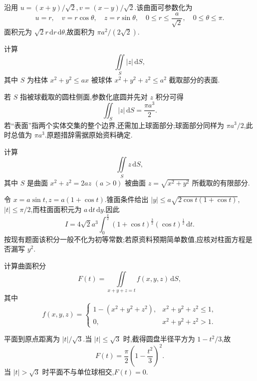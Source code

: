 \begin{solution}
    沿用 $u=(x+y)/\sqrt{2},v=(x-y)/\sqrt{2}$.该曲面可参数化为
    \[
        u=r,\quad v=r\cos\theta,\quad z=r\sin\theta,\quad
        0\leq r\leq\dfrac{a}{\sqrt{2}},\quad0\leq\theta\leq\pi.
    \]
    面积元为 $\sqrt{2}r\,\mathrm{d}r\,\mathrm{d}\theta$,故面积为 $\pi a^2/(2\sqrt{2})$.
\end{solution}

\begin{example}
    计算
    \[
        \iint\limits_S|z|\,\mathrm{d}S,
    \]
    其中 $S$ 为柱体 $x^2+y^2\leq ax$ 被球体 $x^2+y^2+z^2\leq a^2$ 截取部分的表面.
\end{example}
\exampleblank

\begin{solution}
    若 $S$ 指被球截取的圆柱侧面,参数化底圆并先对 $z$ 积分可得
    \[
        \iint_S|z|\,\mathrm{d}S=\dfrac{\pi a^3}{2}.
    \]
    若“表面”指两个实体交集的整个边界,还需加上球面部分;球面部分同样为 $\pi a^3/2$,此时总值为 $\pi a^3$.原题措辞需据原始资料确定.
\end{solution}

\begin{example}
    计算
    \[
        \iint\limits_Sz\,\mathrm{d}S,
    \]
    其中 $S$ 是曲面 $x^2+z^2=2az$ $(a>0)$ 被曲面 $z=\sqrt{x^2+y^2}$ 所截取的有限部分.
\end{example}
\exampleblank

\begin{solution}
    令 $x=a\sin t,z=a(1+\cos t)$.锥面条件给出
    $|y|\leq a\sqrt{2\cos t(1+\cos t)}$,$|t|\leq\pi/2$,而柱面面积元为 $a\,\mathrm{d}t\,\mathrm{d}y$.因此
    \[
        I=4\sqrt{2}a^3\int_0^{\frac{\pi}{2}}(1+\cos t)^{\frac{3}{2}}(\cos t)^{\frac{1}{2}}\,\mathrm{d}t.
    \]
    按现有题面该积分一般不化为初等常数;若原资料预期简单数值,应核对柱面方程是否漏写 $y^2$.
\end{solution}

\begin{example}
    计算曲面积分
    \[
        F(t)=\iint\limits_{x+y+z=t}f(x,y,z)\,\mathrm{d}S,
    \]
    其中
    \[
        f(x,y,z)=
        \begin{cases}
            1-(x^2+y^2+z^2), & x^2+y^2+z^2\leq1, \\
            0,               & x^2+y^2+z^2>1.
        \end{cases}
    \]
\end{example}
\exampleblank

\begin{solution}
    平面到原点距离为 $|t|/\sqrt{3}$.当 $|t|\leq\sqrt{3}$ 时,截得圆盘半径平方为 $1-t^2/3$,故
    \[
        F(t)=\dfrac{\pi}{2}\left(1-\dfrac{t^2}{3}\right)^2.
    \]
    当 $|t|>\sqrt{3}$ 时平面不与单位球相交,$F(t)=0$.
\end{solution}

